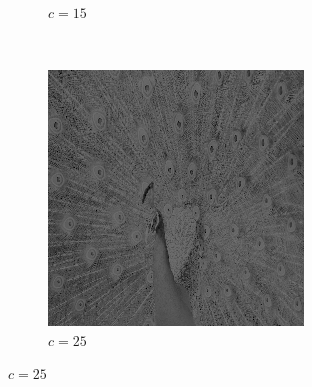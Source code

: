 \documentclass{article}
\begin{document}
\begin{enumerate}[label=(\alph*)]
\begin{figure}[!htb]
\begin{subfigure}[b]{0.3\textwidth}
            \caption{$c = 15$}
        \end{subfigure}
        ~
        \begin{subfigure}[b]{0.3\textwidth}
            \includegraphics[width=\textwidth]{img/LT25.png}
            \caption{$c = 25$}
        \end{subfigure}
        
        

\end{figure}
\end{enumerate}
\end{document}
